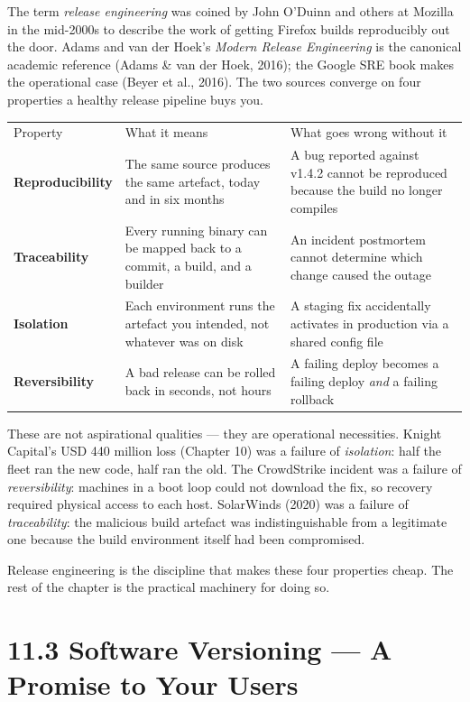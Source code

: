 \documentclass[11pt,a4paper]{book}
\begin{document}
The term \textit{release engineering} was coined by John O'Duinn and others at Mozilla in the mid-2000s to describe the work of getting Firefox builds reproducibly out the door. Adams and van der Hoek's \textit{Modern Release Engineering} is the canonical academic reference (Adams \& van der Hoek, 2016); the Google SRE book makes the operational case (Beyer et al., 2016). The two sources converge on four properties a healthy release pipeline buys you.

\begin{tabular}{lll}
\hline
Property & What it means & What goes wrong without it \\
\textbf{Reproducibility} & The same source produces the same artefact, today and in six months & A bug reported against v1.4.2 cannot be reproduced because the build no longer compiles \\
\textbf{Traceability} & Every running binary can be mapped back to a commit, a build, and a builder & An incident postmortem cannot determine which change caused the outage \\
\textbf{Isolation} & Each environment runs the artefact you intended, not whatever was on disk & A staging fix accidentally activates in production via a shared config file \\
\textbf{Reversibility} & A bad release can be rolled back in seconds, not hours & A failing deploy becomes a failing deploy \textit{and} a failing rollback \\
\hline
\end{tabular}

These are not aspirational qualities --- they are operational necessities. Knight Capital's USD 440 million loss (Chapter 10) was a failure of \textit{isolation}: half the fleet ran the new code, half ran the old. The CrowdStrike incident was a failure of \textit{reversibility}: machines in a boot loop could not download the fix, so recovery required physical access to each host. SolarWinds (2020) was a failure of \textit{traceability}: the malicious build artefact was indistinguishable from a legitimate one because the build environment itself had been compromised.

Release engineering is the discipline that makes these four properties cheap. The rest of the chapter is the practical machinery for doing so.

\medskip

\section{11.3 Software Versioning --- A Promise to Your Users}
\end{document}
